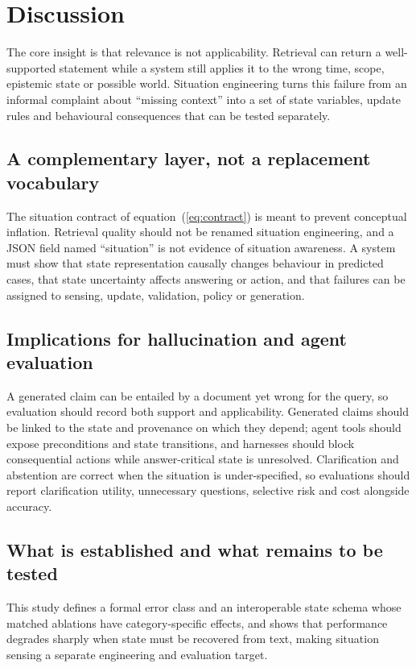 \section*{Discussion}

The core insight is that relevance is not applicability. Retrieval can return a
well-supported statement while a system still applies it to the wrong time,
scope, epistemic state or possible world. Situation engineering turns this
failure from an informal complaint about ``missing context'' into a set of
state variables, update rules and behavioural consequences that can be tested
separately.

\subsection*{A complementary layer, not a replacement vocabulary}

The situation contract of equation~(\ref{eq:contract}) is meant to prevent
conceptual inflation. Retrieval quality should not be
renamed situation engineering, and a JSON field named ``situation'' is not
evidence of situation awareness. A system must show that state representation
causally changes behaviour in predicted cases, that state uncertainty affects
answering or action, and that failures can be assigned to sensing, update,
validation, policy or generation.

\subsection*{Implications for hallucination and agent evaluation}

A generated claim can be entailed by a document yet wrong for the query, so
evaluation should record both support and applicability. Generated claims
should be linked to the state and provenance on which they depend; agent tools
should expose preconditions and state transitions, and harnesses should block
consequential actions while answer-critical state is unresolved. Clarification
and abstention are correct when the situation is under-specified, so
evaluations should report clarification utility, unnecessary questions,
selective risk and cost alongside accuracy.

\subsection*{What is established and what remains to be tested}

This study defines a formal error class and an interoperable state schema
whose matched ablations have category-specific effects, and shows that
performance degrades sharply when state must be recovered from text, making
situation sensing a separate engineering and evaluation target.

